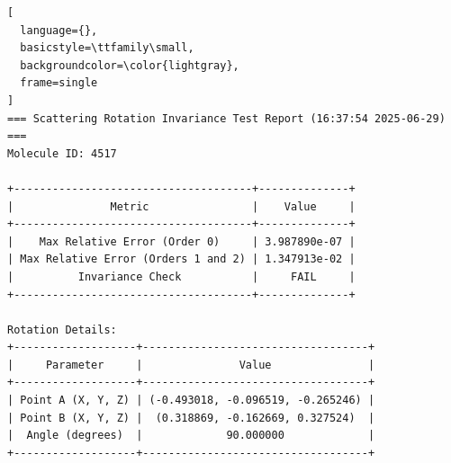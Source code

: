 \documentclass{article}
\begin{document}
\begin{lstlisting}[
  language={},
  basicstyle=\ttfamily\small,
  backgroundcolor=\color{lightgray},
  frame=single
]
=== Scattering Rotation Invariance Test Report (16:37:54 2025-06-29) ===
Molecule ID: 4517

+-------------------------------------+--------------+
|               Metric                |    Value     |
+-------------------------------------+--------------+
|    Max Relative Error (Order 0)     | 3.987890e-07 |
| Max Relative Error (Orders 1 and 2) | 1.347913e-02 |
|          Invariance Check           |     FAIL     |
+-------------------------------------+--------------+

Rotation Details:
+-------------------+-----------------------------------+
|     Parameter     |               Value               |
+-------------------+-----------------------------------+
| Point A (X, Y, Z) | (-0.493018, -0.096519, -0.265246) |
| Point B (X, Y, Z) |  (0.318869, -0.162669, 0.327524)  |
|  Angle (degrees)  |             90.000000             |
+-------------------+-----------------------------------+


\end{lstlisting}
\end{document}
